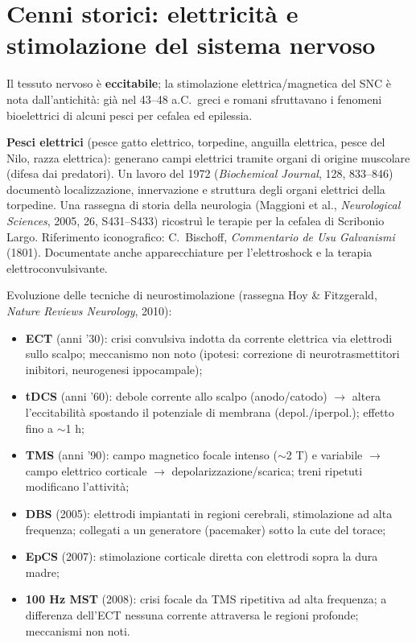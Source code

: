 \section{Cenni storici: elettricità e stimolazione del sistema nervoso}

Il tessuto nervoso è \textbf{eccitabile}; la stimolazione elettrica/magnetica del SNC è nota
dall'antichità: già nel 43--48 a.C.\ greci e romani sfruttavano i fenomeni bioelettrici di alcuni
pesci per cefalea ed epilessia.

\textbf{Pesci elettrici} (pesce gatto elettrico, torpedine, anguilla elettrica, pesce del Nilo,
razza elettrica): generano campi elettrici tramite organi di origine muscolare (difesa dai
predatori). Un lavoro del 1972 (\textit{Biochemical Journal}, 128, 833--846) documentò
localizzazione, innervazione e struttura degli organi elettrici della torpedine. Una rassegna di
storia della neurologia (Maggioni et al., \textit{Neurological Sciences}, 2005, 26, S431--S433)
ricostruì le terapie per la cefalea di Scribonio Largo. Riferimento iconografico: C.\ Bischoff,
\textit{Commentario de Usu Galvanismi} (1801). Documentate anche apparecchiature per l'elettroshock
e la terapia elettroconvulsivante.

Evoluzione delle tecniche di neurostimolazione (rassegna Hoy \& Fitzgerald, \textit{Nature Reviews
Neurology}, 2010):
\begin{itemize}
  \item \textbf{ECT} (anni '30): crisi convulsiva indotta da corrente elettrica via elettrodi sullo
    scalpo; meccanismo non noto (ipotesi: correzione di neurotrasmettitori inibitori, neurogenesi
    ippocampale);
  \item \textbf{tDCS} (anni '60): debole corrente allo scalpo (anodo/catodo) $\rightarrow$ altera
    l'eccitabilità spostando il potenziale di membrana (depol./iperpol.); effetto fino a $\sim$1 h;
  \item \textbf{TMS} (anni '90): campo magnetico focale intenso ($\sim$2 T) e variabile $\rightarrow$
    campo elettrico corticale $\rightarrow$ depolarizzazione/scarica; treni ripetuti modificano
    l'attività;
  \item \textbf{DBS} (2005): elettrodi impiantati in regioni cerebrali, stimolazione ad alta
    frequenza; collegati a un generatore (pacemaker) sotto la cute del torace;
  \item \textbf{EpCS} (2007): stimolazione corticale diretta con elettrodi sopra la dura madre;
  \item \textbf{100 Hz MST} (2008): crisi focale da TMS ripetitiva ad alta frequenza; a differenza
    dell'ECT nessuna corrente attraversa le regioni profonde; meccanismi non noti.
\end{itemize}

